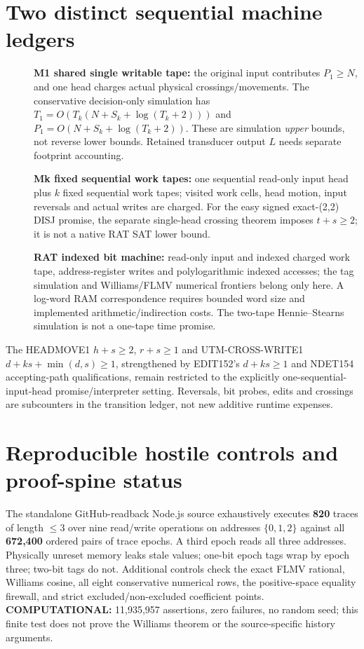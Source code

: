\documentclass[11pt]{article}
\begin{document}
\section{Two distinct sequential machine ledgers}
\begin{description}
\item[] \textbf{M1 shared single writable tape:} the original
input contributes $P_1\ge N$, and one head charges actual physical
crossings/movements. The conservative decision-only simulation has
$T_1=O(T_k(N+S_k+\log(T_k+2)))$ and
$P_1=O(N+S_k+\log(T_k+2))$.
These are simulation \emph{upper} bounds, not reverse lower bounds.
Retained transducer output $L$ needs separate footprint accounting.
\item[] \textbf{Mk fixed sequential work tapes:} one sequential
read-only input head plus $k$ fixed sequential work tapes;
visited work cells, head motion, input reversals and actual
writes are charged. For the easy signed exact-(2,2) DISJ promise,
the separate single-head crossing theorem imposes
$t+s\ge2$; it is not a native RAT SAT lower bound.
\item[] \textbf{RAT indexed bit machine:} read-only input and
indexed charged work tape, address-register writes and
polylogarithmic indexed accesses; the tag simulation and
Williams/FLMV numerical frontiers belong only here.
A log-word RAM correspondence requires bounded word size and
implemented arithmetic/indirection costs. The two-tape
Hennie--Stearns simulation is not a one-tape time promise.
\end{description}
The HEADMOVE1 $h+s\ge2$, $r+s\ge1$ and UTM-CROSS-WRITE1
$d+ks+\min(d,s)\ge1$, strengthened by EDIT152's
$d+ks\ge1$ and NDET154 accepting-path qualifications,
remain restricted to the explicitly one-sequential-input-head
promise/interpreter setting. Reversals, bit probes, edits and
crossings are subcounters in the transition ledger, not new
additive runtime expenses.

\section{Reproducible hostile controls and proof-spine status}
The standalone GitHub-readback Node.js source exhaustively
executes \textbf{820} traces of length $\le3$ over nine
read/write operations on addresses $\{0,1,2\}$
against all \textbf{672,400} ordered pairs of trace epochs.
A third epoch reads all three addresses. Physically unreset
memory leaks stale values; one-bit epoch tags wrap by
epoch three; two-bit tags do not.
Additional controls check the exact FLMV rational,
Williams cosine, all eight conservative numerical rows,
the positive-space equality firewall, and strict
excluded/non-excluded coefficient points.
\textbf{COMPUTATIONAL:} 11,935,957 assertions, zero failures,
no random seed; this finite test does not prove the
Williams theorem or the source-specific history arguments.
\end{document}
